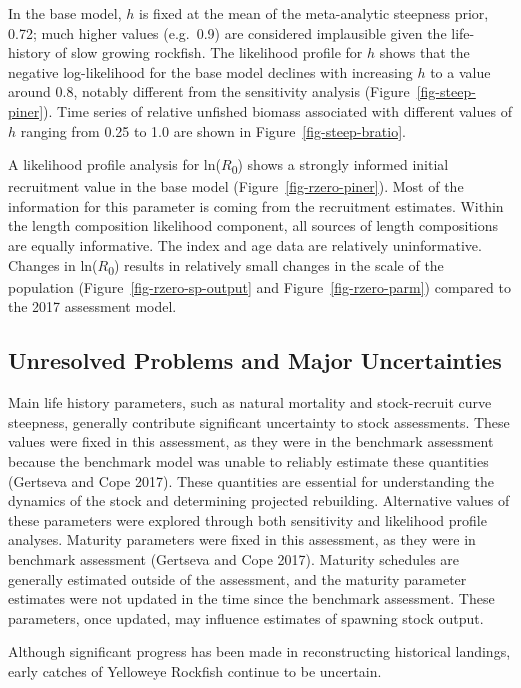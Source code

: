 \documentclass[
]{scrartcl}
\begin{document}
In the base model, \(h\) is fixed at the mean of the meta-analytic
steepness prior, 0.72; much higher values (e.g.~0.9) are considered
implausible given the life-history of slow growing rockfish. The
likelihood profile for \(h\) shows that the negative log-likelihood for
the base model declines with increasing \(h\) to a value around 0.8,
notably different from the sensitivity analysis
(Figure~\ref{fig-steep-piner}). Time series of relative unfished biomass
associated with different values of \(h\) ranging from 0.25 to 1.0 are
shown in Figure~\ref{fig-steep-bratio}.

A likelihood profile analysis for ln(\(R\)\textsubscript{0}) shows a
strongly informed initial recruitment value in the base model
(Figure~\ref{fig-rzero-piner}). Most of the information for this
parameter is coming from the recruitment estimates. Within the length
composition likelihood component, all sources of length compositions are
equally informative. The index and age data are relatively
uninformative. Changes in ln(\(R\)\textsubscript{0}) results in
relatively small changes in the scale of the population
(Figure~\ref{fig-rzero-sp-output} and Figure~\ref{fig-rzero-parm})
compared to the 2017 assessment model.

\subsection{Unresolved Problems and Major
Uncertainties}\label{unresolved-problems-and-major-uncertainties}

Main life history parameters, such as natural mortality and
stock-recruit curve steepness, generally contribute significant
uncertainty to stock assessments. These values were fixed in this
assessment, as they were in the benchmark assessment because the
benchmark model was unable to reliably estimate these quantities
(Gertseva and Cope 2017). These quantities are essential for
understanding the dynamics of the stock and determining projected
rebuilding. Alternative values of these parameters were explored through
both sensitivity and likelihood profile analyses. Maturity parameters
were fixed in this assessment, as they were in benchmark assessment
(Gertseva and Cope 2017). Maturity schedules are generally estimated
outside of the assessment, and the maturity parameter estimates were not
updated in the time since the benchmark assessment. These parameters,
once updated, may influence estimates of spawning stock output.

Although significant progress has been made in reconstructing historical
landings, early catches of Yelloweye Rockfish continue to be uncertain.
\end{document}
